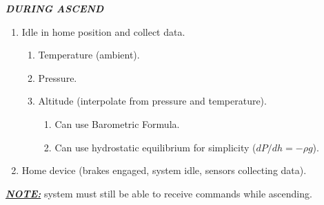 \noindent\textbf{\textit{DURING ASCEND}}
\begin{enumerate}
    \item Idle in home position and collect data.
    \begin{enumerate}[noitemsep, nolistsep, label*=\arabic*.]
        \item Temperature (ambient).
        \item Pressure.
        \item Altitude (interpolate from pressure and temperature).
        \begin{enumerate}[noitemsep, nolistsep, label*=\arabic*.]
            \item Can use Barometric Formula.
            \item Can use hydrostatic equilibrium for simplicity ($dP/dh = -\rho g$).
        \end{enumerate}
    \end{enumerate}
    \item Home device (brakes engaged, system idle, sensors collecting data).
\end{enumerate}
\noindent\textbf{\textit{\underline{NOTE:}}} system must still be able to receive commands while ascending.

\vspace{5mm}

